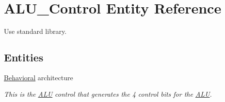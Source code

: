 \hypertarget{class_a_l_u___control}{\section{\-A\-L\-U\-\_\-\-Control \-Entity \-Reference}
\label{class_a_l_u___control}
}


\-Use standard library.  


\subsection*{\-Entities}
\begin{DoxyCompactItemize}
\item 
\hyperlink{class_a_l_u___control_1_1_behavioral}{\-Behavioral} architecture
\begin{DoxyCompactList}\small\item\em \-This is the \hyperlink{class_a_l_u}{\-A\-L\-U} control that generates the 4 control bits for the \hyperlink{class_a_l_u}{\-A\-L\-U}. \end{DoxyCompactList}\end{DoxyCompactItemize}
\*
\*
